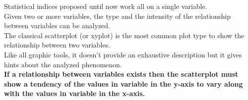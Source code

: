 %
%




\begin{frame}
  \vspace*{.3cm}
  Statistical indices proposed until now work all on a single variable.\\
  \vspace*{.4cm}
  Given two or more variables, the type and the intensity of the relationship between variables can be analyzed.\\
  \vspace*{.4cm}
  The classical scatterplot (or xyplot) is the most common plot type to show the relationship between two variables.\\
  \vspace*{.4cm}
  Like all graphic tools, it doesn't provide an exhaustive description but it gives hints about the analyzed phenomenon.\\
  \vspace*{.4cm}
  \textbf{If a relationship between variables exists then the scatterplot must show a tendency of the values in variable in the y-axis to vary along with the values in variable in the x-axis.}
\end{frame}

